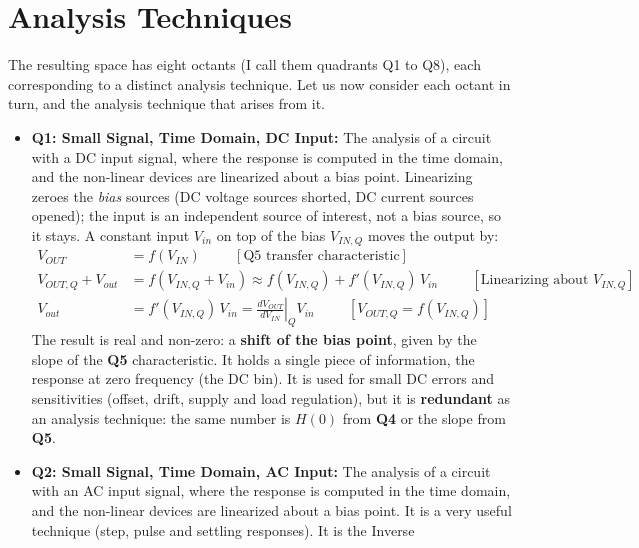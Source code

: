 \section{Analysis Techniques}

The resulting space has eight octants (I call them quadrants Q1 to Q8),
each corresponding to a distinct analysis technique. Let us now consider
each octant in turn, and the
analysis technique that arises from it.

\begin{itemize}
    \item \textbf{Q1: Small Signal, Time Domain, DC Input:}
      The analysis of a circuit with a DC input signal, where the response is
      computed in the time domain, and the non-linear devices are linearized
      about a bias point. Linearizing zeroes the \emph{bias} sources (DC voltage
      sources shorted, DC current sources opened); the input is an independent
      source of interest, not a bias source, so it stays. A constant input
      \(V_{in}\) on top of the bias \(V_{IN,Q}\) moves the output by:
      \begin{align*}
        V_{OUT} &= f(V_{IN}) \hspace{1cm} [\text{Q5 transfer characteristic}] \\
        V_{OUT,Q} + V_{out} &= f(V_{IN,Q} + V_{in}) \approx f(V_{IN,Q}) + f'(V_{IN,Q})\, V_{in} \hspace{1cm} [\text{Linearizing about } V_{IN,Q}] \\
        V_{out} &= f'(V_{IN,Q})\, V_{in} = \left.\frac{dV_{OUT}}{dV_{IN}}\right|_{Q} V_{in} \hspace{1cm} [V_{OUT,Q} = f(V_{IN,Q})]
      \end{align*}
      The result is real and non-zero: a \textbf{shift of the bias point}, given
      by the slope of the \textbf{Q5} characteristic. It holds a single piece of
      information, the response at zero frequency (the DC bin). It is used for
      small DC errors and sensitivities (offset, drift, supply and load
      regulation), but it is \textbf{redundant} as an analysis technique: the
      same number is \(H(0)\) from \textbf{Q4} or the slope from \textbf{Q5}.
    \item \textbf{Q2: Small Signal, Time Domain, AC Input:}
      The analysis of a circuit with an AC input
      signal, where the response is computed in the time domain, and the
      non-linear devices are linearized about a bias point. It is a very
      useful technique (step, pulse and settling responses). It is the Inverse

\end{itemize}
